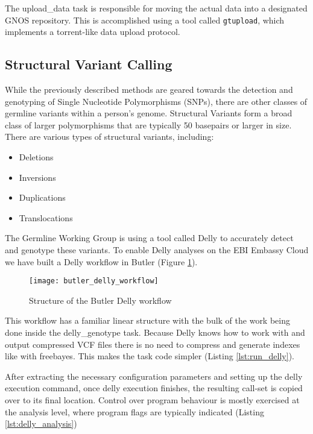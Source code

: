 The upload\_data task is responsible for moving the actual data into a designated GNOS repository. This is accomplished using a tool called \texttt{gtupload}, which implements a torrent-like data upload protocol. 

\subsection {Structural Variant Calling}

While the previously described methods are geared towards the detection and genotyping of Single Nucleotide Polymorphisms (SNPs), there are other classes of germline variants within a person's genome. Structural Variants form a broad class of larger polymorphisms that are typically 50 basepairs or larger in size\autocite{sudmant2015integrated}. There are various types of structural variants, including:

\begin{itemize}
\item Deletions
\item Inversions
\item Duplications
\item Translocations
\end{itemize}
\newpage
The Germline Working Group is using a tool called Delly\autocite{rausch2012delly} to accurately detect and genotype these variants. To enable Delly analyses on the EBI Embassy Cloud we have built a Delly workflow in Butler (Figure \ref{fig:butler_delly_workflow}).

\begin{figure}[H]
\texttt{[image: butler\_delly\_workflow]}
\centering
\caption {Structure of the Butler Delly workflow}
\label{fig:butler_delly_workflow}
\end{figure}

This workflow has a familiar linear structure with the bulk of the work being done inside the delly\_genotype task. Because Delly knows how to work with and output compressed VCF files there is no need to compress and generate indexes like with freebayes. This makes the task code simpler (Listing \ref{lst:run_delly}).


After extracting the necessary configuration parameters and setting up the delly execution command, once delly execution finishes, the resulting call-set is copied over to its final location. Control over program behaviour is mostly exercised at the analysis level, where program flags are typically indicated (Listing \ref{lst:delly_analysis})

